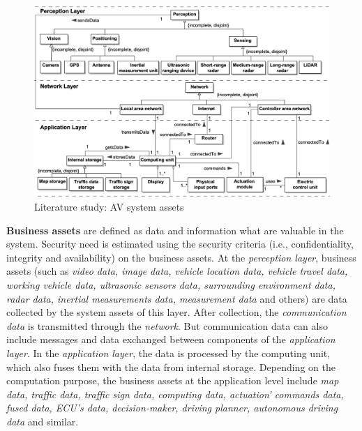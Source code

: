 \documentclass[runningheads]{llncs}
\begin{document}
\begin{figure}[h!]
  \vspace{-15pt}
  \centering
  \includegraphics[width=0.9\linewidth]{AVasset}
  \caption{Literature study: AV system assets} 
  \label{fig:AssetModel}
  \vspace{-15pt}
\end{figure}
\textbf{Business assets} are defined as data and information what are valuable in the system. Security need is estimated using the security criteria (i.e., confidentiality, integrity and availability) on the business assets. At the \textit{perception layer}, business assets (such as \textit{video data, image data, vehicle location data, vehicle travel data, working vehicle data, ultrasonic sensors data, surrounding environment data, radar data, inertial measurements data, measurement data} and others) are data collected by the system assets of this layer. After collection, the \textit{communication data} is transmitted through the \textit{network}. But communication data can also include messages and data exchanged between components of the \textit{application layer}. 
%
In the \textit{application layer}, the data is processed by the computing unit, which also fuses them with the data from internal storage.  
Depending on the computation purpose, the business assets at the application level include \textit{map data, traffic data, traffic sign data, computing data, actuation’ commands data, fused data, ECU’s data, decision-maker, driving planner, autonomous driving data} and similar.
\end{document}
